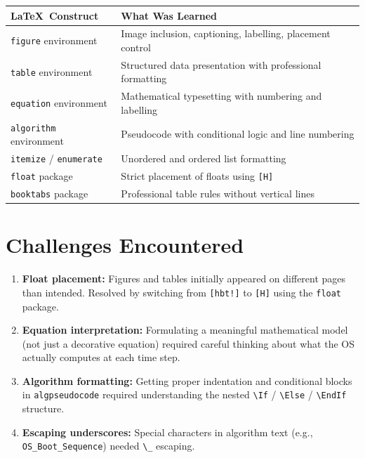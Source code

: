 \documentclass[11pt, a4paper]{article}
\begin{document}
\begin{longtable}{@{}p{5cm} p{9.5cm}@{}}
    \toprule
    \textbf{\LaTeX\ Construct} & \textbf{What Was Learned} \\
    \midrule
    \texttt{figure} environment & Image inclusion, captioning, labelling, placement control \\
    \texttt{table} environment & Structured data presentation with professional formatting \\
    \texttt{equation} environment & Mathematical typesetting with numbering and labelling \\
    \texttt{algorithm} environment & Pseudocode with conditional logic and line numbering \\
    \texttt{itemize} / \texttt{enumerate} & Unordered and ordered list formatting \\
    \texttt{float} package & Strict placement of floats using \texttt{[H]} \\
    \texttt{booktabs} package & Professional table rules without vertical lines \\
    \bottomrule
\end{longtable}

\section{Challenges Encountered}

\begin{enumerate}[nosep]
    \item \textbf{Float placement:} Figures and tables initially appeared on different pages than intended. Resolved by switching from \texttt{[hbt!]} to \texttt{[H]} using the \texttt{float} package.
    \item \textbf{Equation interpretation:} Formulating a meaningful mathematical model (not just a decorative equation) required careful thinking about what the OS actually computes at each time step.
    \item \textbf{Algorithm formatting:} Getting proper indentation and conditional blocks in \texttt{algpseudocode} required understanding the nested \texttt{\textbackslash If} / \texttt{\textbackslash Else} / \texttt{\textbackslash EndIf} structure.
    \item \textbf{Escaping underscores:} Special characters in algorithm text (e.g., \texttt{OS\_Boot\_Sequence}) needed \texttt{\textbackslash\_} escaping.
\end{enumerate}
\end{document}
